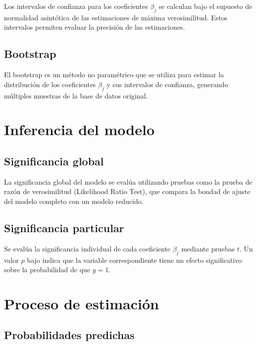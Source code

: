 \documentclass[
  letterpaper,
  DIV=11,
  numbers=noendperiod]{scrreprt}
\begin{document}
Los intervalos de confianza para los coeficientes \(\beta_j\) se
calculan bajo el supuesto de normalidad asintótica de las estimaciones
de máxima verosimilitud. Estos intervalos permiten evaluar la precisión
de las estimaciones.

\subsection{Bootstrap}\label{bootstrap-2}

El bootstrap es un método no paramétrico que se utiliza para estimar la
distribución de los coeficientes \(\beta_j\) y sus intervalos de
confianza, generando múltiples muestras de la base de datos original.

\section{Inferencia del modelo}\label{inferencia-del-modelo-2}

\subsection{Significancia global}\label{significancia-global-1}

La significancia global del modelo se evalúa utilizando pruebas como la
prueba de razón de verosimilitud (Likelihood Ratio Test), que compara la
bondad de ajuste del modelo completo con un modelo reducido.

\subsection{Significancia particular}\label{significancia-particular-1}

Se evalúa la significancia individual de cada coeficiente \(\beta_j\)
mediante pruebas \(t\). Un valor \(p\) bajo indica que la variable
correspondiente tiene un efecto significativo sobre la probabilidad de
que \(y = 1\).

\section{Proceso de estimación}\label{proceso-de-estimaciuxf3n-4}

\subsection{Probabilidades predichas}\label{probabilidades-predichas}
\end{document}

